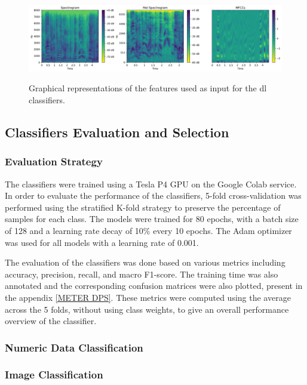 \begin{figure}[H]
	\centering
	\includegraphics[width=\textwidth]{figs/4_4_deep_learning/features.png}
	\label{fig:dl_features}
	\caption{Graphical representations of the features used as input for the \ac{dl} classifiers.}
\end{figure}



\subsection{Classifiers Evaluation and Selection}

\subsubsection{Evaluation Strategy}

The classifiers were trained using a Tesla P4 GPU on the Google Colab service. In order to evaluate the performance of the classifiers, 5-fold cross-validation was performed using the stratified K-fold strategy to preserve the percentage of samples for each class. The models were trained for 80 epochs, with a batch size of 128 and a learning rate decay of 10\% every 10 epochs. The Adam optimizer was used for all models with a learning rate of 0.001.

The evaluation of the classifiers was done based on various metrics including accuracy, precision, recall, and macro F1-score. The training time was also annotated and the corresponding confusion matrices were also plotted, present in the appendix \ref{METER DPS}. These metrics were computed using the average across the 5 folds, without using class weights, to give an overall performance overview of the classifier.

\subsubsection{Numeric Data Classification}


\subsubsection{Image Classification}

